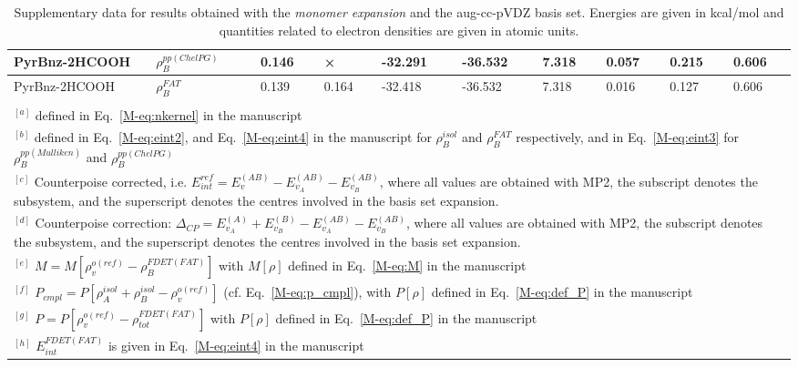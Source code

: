 \documentclass[amsmath,amssymb,preprint,aip,jcp]{revtex4-1}
\begin{document}
\begin{table}[H]
\begin{center}
{\begin{tabular}{|l|l|l|l|l|l|l|l|l|l|}
PyrBnz-2HCOOH & $\rho_B^{pp(ChelPG)}$ & 0.146 & × & -32.291 & -36.532 & 7.318 & 0.057 & 0.215 & 0.606\\\hline
PyrBnz-2HCOOH & $\rho_B^{FAT}$ & 0.139 & 0.164 & -32.418 & -36.532 & 7.318 & 0.016 & 0.127 & 0.606\\\hline
\multicolumn{10}{c}{ } \\
\multicolumn{10}{p{1.0\textwidth}}{$^{[a]}$ defined in Eq.~\ref{M-eq:nkernel} in the manuscript}\\
\multicolumn{10}{p{1.0\textwidth}}{$^{[b]}$ defined in Eq.~\ref{M-eq:eint2}, and Eq.~\ref{M-eq:eint4} in the manuscript for $\rho_B^{isol}$ and $\rho_B^{FAT }$ respectively, and in Eq.~\ref{M-eq:eint3} for $\rho_B^{pp(Mulliken)}$ and $\rho_B^{pp(ChelPG)}$}\\
\multicolumn{10}{p{1.0\textwidth}}{$^{[c]}$ Counterpoise corrected, i.e. $E_{int}^{ref} = E_{v}^{(AB)} - E_{v_A}^{(AB)} - E_{v_B}^{(AB)}$, where all values are obtained with MP2, the subscript denotes the subsystem, and the superscript denotes the centres involved in the basis set expansion.} \\
\multicolumn{10}{p{1.0\textwidth}}{$^{[d]}$ Counterpoise correction: $\Delta_{CP} = E_{v_A}^{(A)} + E_{v_B}^{(B)} - E_{v_A}^{(AB)} - E_{v_B}^{(AB)}$, where all values are obtained with MP2, the subscript denotes the subsystem, and the superscript denotes the centres involved in the basis set expansion.} \\
\multicolumn{10}{p{1.0\textwidth}}{$^{[e]}$ $M=M[\rho_v^{o(ref)} - \rho^{FDET(FAT)}_{B}]$ with $M[\rho]$ defined in Eq.~\ref{M-eq:M} in the manuscript}\\
\multicolumn{10}{p{1.0\textwidth}}{$^{[f]}$ $P_{cmpl}=P[\rho_A^{isol}+\rho_B^{isol} - \rho_v^{o(ref)}]$ (cf. Eq.~\ref{M-eq:p_cmpl}), with $P[\rho]$ defined in Eq.~\ref{M-eq:def_P} in the manuscript}\\
\multicolumn{10}{p{1.0\textwidth}}{$^{[g]}$ $P=P[\rho_v^{o(ref)} - \rho_{tot}^{FDET(FAT)}]$ with $P[\rho]$ defined in Eq.~\ref{M-eq:def_P} in the manuscript}\\
\multicolumn{10}{p{1.0\textwidth}}{$^{[h]}$ $E^{FDET(FAT)}_{int}$ is given in Eq.~\ref{M-eq:eint4} in the manuscript}\\
\end{tabular}
}
\end{center}
\caption{Supplementary data for results obtained with the \textit{monomer expansion} and the aug-cc-pVDZ basis set. Energies are given in kcal/mol and quantities related to electron densities are given in atomic units.}
\end{table}
\end{document}
